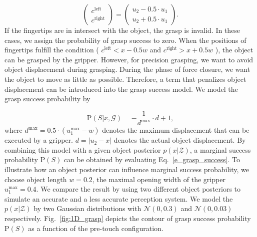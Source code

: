 \begin{equation}
\begin{pmatrix}
c^{\text{left}}\\ 
c^{\text{right}}
\end{pmatrix}
=\begin{pmatrix}
u_2 - 0.5 \cdot u_1\\ 
u_2 + 0.5 \cdot u_1
\end{pmatrix}.
\end{equation}
If the fingertips are in intersect with the object, the grasp is invalid. In these cases, we assign the probability of grasp success to zero. When the positions of fingertips fulfill the condition ( $c^{\text{left}} < x - 0.5w$ and $c^{\text{right}} > x + 0.5w$ ), the object can be grasped by the gripper. However, for precision grasping, we want to avoid object displacement during grasping. During the phase of force closure, we want the object to move as little as possible. Therefore, a term that penalizes object displacement can be introduced into the grasp success model. We model the grasp success probability by 

\begin{equation}
  \text{P}(S | x,  \mathcal{G} )  = -\frac{1}{ d^{\text{max}} } \cdot d + 1,
  \label{equ:5}
\end{equation}
where $d^{\text{max}}  = 0.5 \cdot (u_{1}^{\text{max}} - w) $ denotes the maximum displacement that can be executed by a gripper. $d = | u_2 - x | $ denotes the actual object displacement. By combining this model with a given object posterior $p(x|\mathcal{Z})$, a marginal success probability $\text{P}(S)$ can be obtained by evaluating Eq.~\ref{e_grasp_success}. To illustrate how an object posterior can influence marginal success probability, we choose object length $w = 0.2$, the maximal opening width of the gripper $u_{1}^{\text{max}} = 0.4 $. We compare the result by using two different object posteriors to simulate an accurate and a less accurate perception system. We model the $p(x|\mathcal{Z})$ by two Gaussian distributions with $\mathcal{N}(0, 0.3)$ and $\mathcal{N}(0, 0.03)$ respectively. Fig.~\ref{fig:1D_grasp} depicts the contour of grasp success probability $\text{P}(S)$ as a function of the pre-touch configuration.

